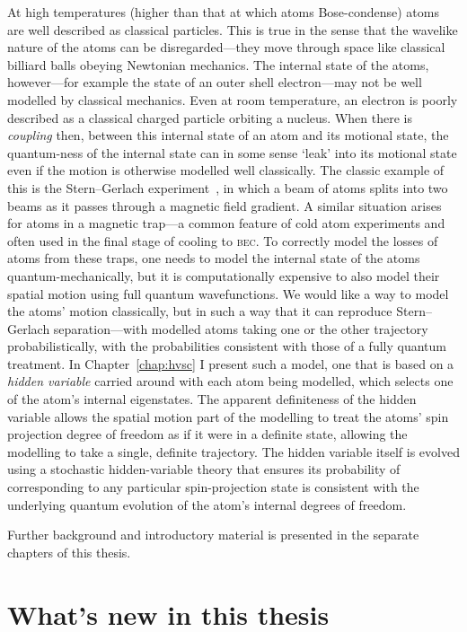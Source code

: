 At high temperatures (higher than that at which atoms Bose-condense) atoms are well described as classical particles. This is true in the sense that the wavelike nature of the atoms can be disregarded---they move through space like classical billiard balls obeying Newtonian mechanics. The internal state of the atoms, however---for example the state of an outer shell electron---may not be well modelled by classical mechanics. Even at room temperature, an electron is poorly described as a classical charged particle orbiting a nucleus. When there is \emph{coupling} then, between this internal state of an atom and its motional state, the quantum-ness of the internal state can in some sense `leak' into its motional state even if the motion is otherwise modelled well classically. The classic example of this is the Stern--Gerlach experiment~\cite{gerlach_experimentelle_1922}, in which a beam of atoms splits into two beams as it passes through a magnetic field gradient. A similar situation arises for atoms in a magnetic trap---a common feature of cold atom experiments and often used in the final stage of cooling to \textsc{bec}. To correctly model the losses of atoms from these traps, one needs to model the internal state of the atoms quantum-mechanically, but it is computationally expensive to also model their spatial motion using full quantum wavefunctions. We would like a way to model the atoms' motion classically, but in such a way that it can reproduce Stern--Gerlach separation---with modelled atoms taking one or the other trajectory probabilistically, with the probabilities consistent with those of a fully quantum treatment. In Chapter~\ref{chap:hvsc} I present such a model, one that is based on a \emph{hidden variable} carried around with each atom being modelled, which selects one of the atom's internal eigenstates. The apparent definiteness of the hidden variable allows the spatial motion part of the modelling to treat the atoms' spin projection degree of freedom as if it were in a definite state, allowing the modelling to take a single, definite trajectory. The hidden variable itself is evolved using a stochastic hidden-variable theory that ensures its probability of corresponding to any particular spin-projection state is consistent with the underlying quantum evolution of the atom's internal degrees of freedom.

Further background and introductory material is presented in the separate chapters of this thesis.

\section{What's new in this thesis}

